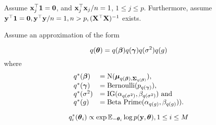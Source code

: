 \documentclass{amsart}[12pt]
\begin{document}
Assume ${\bf x}_j^\top{\bf1} = {\bf 0}$, and ${\bf x}_j^\top {\bf x}_j / n = 1$, $1 \leq j \leq p$.
Furthermore, assume ${\bf y}^\top {\bf1} = {\bf 0}, {\bf y}^\top {\bf y} / n  = 1, n > p, ({\bf X}^\top {\bf X})^{-1}$ exists.

Assume an approximation of the form

\begin{equation*}
q({\boldsymbol \theta}) = q({\boldsymbol \beta}) q({\boldsymbol \gamma}) q(\sigma^2) q(g)
\end{equation*}
where
\begin{equation*}
\begin{array}{ll}
q^*({\boldsymbol \beta}) &= \text{N}({\boldsymbol \mu}_{q({\boldsymbol \beta}), {\boldsymbol \Sigma}_{q({\boldsymbol \beta})}}), \\
q^*({\boldsymbol \gamma}) &= \text{Bernoulli}(p_{q({\boldsymbol \gamma})}), \\
q^*(\sigma^2) &= \text{IG}(\alpha_{q(\sigma^2)}, \beta_{q(\sigma^2)}) \text{ and } \\
q^*(g) &= \text{Beta Prime}(\alpha_{q(g)}, \beta_{q(g)})). \\
\end{array}
\end{equation*}

\begin{equation*}
q_i^*({\boldsymbol \theta}_i) \propto \exp{ {\mathbb E}_{-{\boldsymbol\theta}_i} \log{p({\bf y}, {\boldsymbol\theta})} }, 1 \leq i \leq M
\end{equation*}
\end{document}
